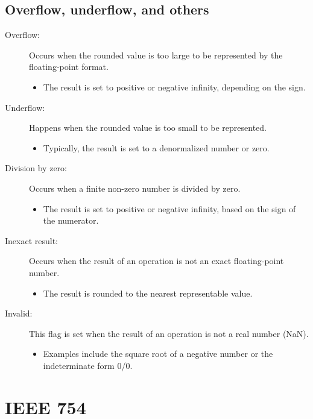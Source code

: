 \documentclass[12pt,openany, tikz,border=10pt]{book}
\begin{document}
\subsection{Overflow, underflow, and others}
\begin{description}
    \item[Overflow:] Occurs when the rounded value is too large to be represented by the floating-point format.
    \begin{itemize}
        \item The result is set to positive or negative infinity, depending on the sign.
    \end{itemize}
    
    \item[Underflow:] Happens when the rounded value is too small to be represented.
    \begin{itemize}
        \item Typically, the result is set to a denormalized number or zero.
    \end{itemize}
    
    \item[Division by zero:] Occurs when a finite non-zero number is divided by zero.
    \begin{itemize}
        \item The result is set to positive or negative infinity, based on the sign of the numerator.
    \end{itemize}
    
    \item[Inexact result:] Occurs when the result of an operation is not an exact floating-point number.
    \begin{itemize}
        \item The result is rounded to the nearest representable value.
    \end{itemize}
    
    \item[Invalid:] This flag is set when the result of an operation is not a real number (NaN).
    \begin{itemize}
        \item Examples include the square root of a negative number or the indeterminate form 0/0.
    \end{itemize}
\end{description}

\section*{IEEE 754}
\end{document}
